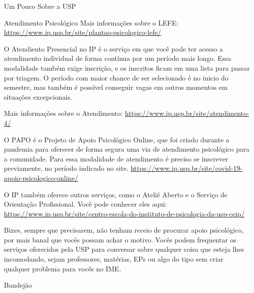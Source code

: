 \begin{secao}{Um Pouco Sobre a USP}
\begin{subsecao}{Atendimento Psicológico}
Mais informações sobre o LEFE: 
\url{https://www.ip.usp.br/site/plantao-psicologico-lefe/}

O Atendiento Presencial no IP é o serviço em que você pode ter acesso a
atendimento individual de forma contínua por um período mais longo. Essa
modalidade também exige inscrição, e os inscritos ficam em uma lista para
passar por triagem. O período com maior chance de ser selecionado é no inicio
do semestre, mas também é possível conseguir vagas em outros momentos em 
situações excepcionais. 

Mais informações sobre o Atendimento:
\url{https://www.ip.usp.br/site/atendimento-4/}

O PAPO é o Projeto de Apoio Psicológico Online, que foi criado durante a 
pandemia para oferecer de forma segura uma via de atendimento psicológico
para a comunidade. Para essa modalidade de atendimento é preciso se inscrever
previamente, no período indicado no site.
\url{https://www.ip.usp.br/site/covid-19-apoio-psicologico-online/}

O IP também oferece outros serviços, como o Ateliê Aberto e o Serviço
de Orientação Profissional. Você pode conhecer eles aqui:
\url{https://www.ip.usp.br/site/centro-escola-do-instituto-de-psicologia-da-usp-ceip/}



Bixes, sempre que precisarem, não tenham receio de procurar apoio
psicológico, por mais banal que vocês possam achar o motivo. Vocês
podem frequentar os serviços oferecidos pela USP para conversar sobre
qualquer coisa que esteja lhes incomodando, sejam professores,
matérias, EPs ou algo do tipo sem criar qualquer
problema para vocês no IME.

\end{subsecao}
\pagebreak

\begin{subsecao}{Bandejão}



\end{subsecao}
\end{secao}
